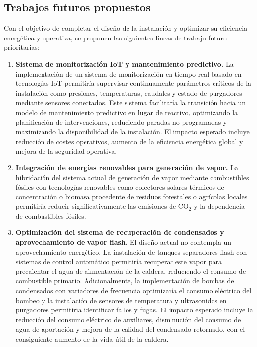 \documentclass[12pt]{article}
\begin{document}
\subsection{Trabajos futuros propuestos}
\label{subsec:trabajos-futuros}

Con el objetivo de completar el diseño de la instalación y optimizar su eficiencia energética y operativa, se proponen las siguientes líneas de trabajo futuro prioritarias:

\begin{enumerate}[label=\arabic*., leftmargin=2em]
	\item \textbf{Sistema de monitorización IoT y mantenimiento predictivo.} La implementación de un sistema de monitorización en tiempo real basado en tecnologías IoT permitiría supervisar continuamente parámetros críticos de la instalación como presiones, temperaturas, caudales y estado de purgadores mediante sensores conectados. Este sistema facilitaría la transición hacia un modelo de mantenimiento predictivo en lugar de reactivo, optimizando la planificación de intervenciones, reduciendo paradas no programadas y maximizando la disponibilidad de la instalación. El impacto esperado incluye reducción de costes operativos, aumento de la eficiencia energética global y mejora de la seguridad operativa.

	\item \textbf{Integración de energías renovables para generación de vapor.} La hibridación del sistema actual de generación de vapor mediante combustibles fósiles con tecnologías renovables como colectores solares térmicos de concentración o biomasa procedente de residuos forestales o agrícolas locales permitiría reducir significativamente las emisiones de CO$_2$ y la dependencia de combustibles fósiles.

	\item \textbf{Optimización del sistema de recuperación de condensados y aprovechamiento de vapor flash.} El diseño actual no contempla un aprovechamiento energético. La instalación de tanques separadores flash con sistemas de control automático permitiría recuperar este vapor para precalentar el agua de alimentación de la caldera, reduciendo el consumo de combustible primario. Adicionalmente, la implementación de bombas de condensados con variadores de frecuencia optimizaría el consumo eléctrico del bombeo y la instalación de sensores de temperatura y ultrasonidos en purgadores permitiría identificar fallos y fugas. El impacto esperado incluye la reducción del consumo eléctrico de auxiliares, disminución del consumo de agua de aportación y mejora de la calidad del condensado retornado, con el consiguiente aumento de la vida útil de la caldera.
\end{enumerate}
\end{document}
